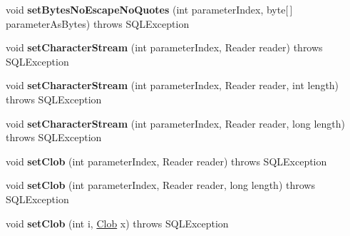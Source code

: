 \begin{DoxyCompactItemize}
\mbox{\label{classcom_1_1mysql_1_1cj_1_1jdbc_1_1_client_prepared_statement_a268b6e65cc67b813b8a4348498f3861b}} 
void {\bfseries set\+Bytes\+No\+Escape\+No\+Quotes} (int parameter\+Index, byte\mbox{[}$\,$\mbox{]} parameter\+As\+Bytes)  throws S\+Q\+L\+Exception 
\item 
\mbox{\label{classcom_1_1mysql_1_1cj_1_1jdbc_1_1_client_prepared_statement_a5cf80174809557f14d69598a40a63dde}} 
void {\bfseries set\+Character\+Stream} (int parameter\+Index, Reader reader)  throws S\+Q\+L\+Exception 
\item 
\mbox{\label{classcom_1_1mysql_1_1cj_1_1jdbc_1_1_client_prepared_statement_a0eee1d087bfd59e43eab2044bdef9399}} 
void {\bfseries set\+Character\+Stream} (int parameter\+Index, Reader reader, int length)  throws S\+Q\+L\+Exception 
\item 
\mbox{\label{classcom_1_1mysql_1_1cj_1_1jdbc_1_1_client_prepared_statement_a551fab80872ae237650491dde1dc4aa5}} 
void {\bfseries set\+Character\+Stream} (int parameter\+Index, Reader reader, long length)  throws S\+Q\+L\+Exception 
\item 
\mbox{\label{classcom_1_1mysql_1_1cj_1_1jdbc_1_1_client_prepared_statement_aba19a5a54ecc0a558f2d48e64386086f}} 
void {\bfseries set\+Clob} (int parameter\+Index, Reader reader)  throws S\+Q\+L\+Exception 
\item 
\mbox{\label{classcom_1_1mysql_1_1cj_1_1jdbc_1_1_client_prepared_statement_a014adbee9d39d688a45b39ccb61f8707}} 
void {\bfseries set\+Clob} (int parameter\+Index, Reader reader, long length)  throws S\+Q\+L\+Exception 
\item 
\mbox{\label{classcom_1_1mysql_1_1cj_1_1jdbc_1_1_client_prepared_statement_a15fa1b4e785622309c79db55fe2ee366}} 
void {\bfseries set\+Clob} (int i, \mbox{\hyperlink{classcom_1_1mysql_1_1cj_1_1jdbc_1_1_clob}{Clob}} x)  throws S\+Q\+L\+Exception 

\end{DoxyCompactItemize}
